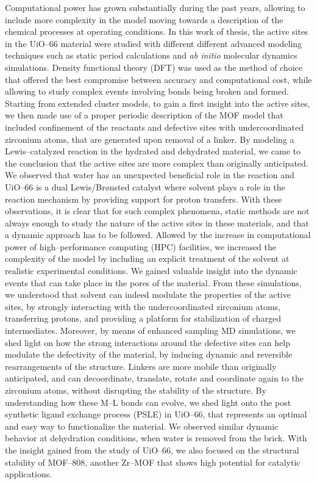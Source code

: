 \npar
Computational power has grown substantially during the past years, allowing to include more complexity in the model moving towards a description of the chemical processes at operating conditions. In this work of thesis, the active sites in the UiO--66 material were studied with different different advanced modeling techniques such as static period calculations and \textit{ab initio} molecular dynamics simulations. Density functional theory (DFT) was used as the method of choice that offered the best compromise between accuracy and computational cost, while allowing to study complex events involving bonds being broken and formed. Starting from extended cluster models, to gain a first insight into the active sites, we then made use of a proper periodic description of the MOF model that included confinement of the reactants and defective sites with undercoordinated zirconium atoms, that are generated upon removal of a linker. By modeling a Lewis--catalyzed reaction in the hydrated and dehydrated material, we came to the conclusion that the active sites are more complex than originally anticipated. We observed that water has an unexpected beneficial role in the reaction and UiO--66 is a dual Lewis/Br\o{}nsted catalyst where solvent plays a role in the reaction mechanism by providing support for proton transfers. 
\npar
With these observations, it is clear that for such complex phenomena, static methods are not always enough to study the nature of the active sites in these materials, and that a dynamic approach has to be followed. Allowed by the increase in computational power of high--performance computing (HPC) facilities, we increased the complexity of the model by including an explicit treatment of the solvent at realistic experimental conditions. We gained valuable insight into the dynamic events that can take place in the pores of the material. From these simulations, we understood that solvent can indeed modulate the properties of the active sites, by strongly interacting with the undercoordinated zirconium atoms, transferring protons, and providing a platform for stabilization of charged intermediates. Moreover, by means of enhanced sampling MD simulations, we shed light on how the strong interactions around the defective sites can help modulate the defectivity of the material, by inducing dynamic and reversible rearrangements of the structure. Linkers are more mobile than originally anticipated, and can decoordinate, translate, rotate and coordinate again to the zirconium atoms, without disrupting the stability of the structure. By understanding how these M--L bonds can evolve, we shed light onto the post synthetic ligand exchange process (PSLE) in UiO--66, that represents an optimal and easy way to functionalize the material. We observed similar dynamic behavior at dehydration conditions, when water is removed from the brick. With the insight gained from the study of UiO--66, we also focused on the structural stability of MOF--808, another Zr--MOF that shows high potential for catalytic applications. 
